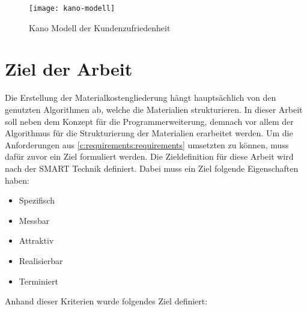 \begin{figure}[h]
	\centering
	\texttt{[image: kano-modell]}
	\caption{Kano Modell der Kundenzufriedenheit}
	\label{fig:kano-model}
\end{figure}

\section{Ziel der Arbeit}
\label{c:intro:target}
Die Erstellung der Materialkostengliederung hängt hauptsächlich von den genutzten Algorithmen ab, welche die Materialien strukturieren. In dieser Arbeit soll neben dem Konzept für die Programmerweiterung, demnach vor allem der Algorithmus für die Strukturierung der Materialien erarbeitet werden. 
Um die Anforderungen aus \autoref{c:requirements:requirements} umsetzten zu können, muss dafür zuvor ein Ziel formuliert werden. Die Zieldefinition für diese Arbeit wird nach der SMART Technik definiert. Dabei muss ein Ziel folgende Eigenschaften haben:

\begin{itemize}
	\setlength\itemsep{0.01em}
	\item Spezifisch
	\item Messbar
	\item Attraktiv
	\item Realisierbar
	\item Terminiert
\end{itemize}

Anhand dieser Kriterien wurde folgendes Ziel definiert:



